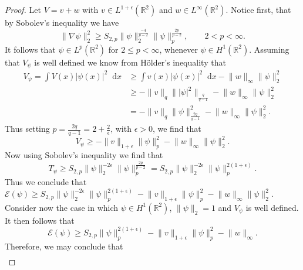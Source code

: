 \documentclass[a4paper,11pt]{article}
\newcommand*\diff{\mathop{}\!\mathrm{d}}
\newcommand{\R}{\mathbb{R}}
\numberwithin{equation}{section}
\begin{document}
\begin{proof}
	Let $ V=v+w $ with $ v\in L^{1+\epsilon}(\R^2)  $ and $ w\in L^\infty(\R^2) $. Notice first, that by Sobolev's inequality we have \begin{equation}
	\lVert\nabla\psi\rVert_2^2\geq S_{2,p}\lVert\psi\rVert_2^{\frac{-4}{p-2}}\lVert\psi\rVert_p^{\frac{2p}{p-2}},\qquad 2<p<\infty.
	\end{equation}
	It follows that $ \psi\in L^p(\R^2) $ for $ 2\leq p<\infty $, whenever $ \psi\in H^1(\R^2) $.
	Assuming that $ V_\psi $ is well defined we know from H\"older's inequality that\begin{equation}
	\begin{aligned}
	V_\psi=\int V(x)\lvert\psi(x)\rvert^2 \diff x&\geq\int v(x)\lvert\psi(x)\rvert^2 \diff x-\lVert w\rVert_\infty \lVert \psi\rVert_2^2\\&\geq-\lVert v\rVert_q\lVert|\psi|^2\rVert_{\frac{q}{q-1}}-\lVert w\rVert_\infty \lVert \psi\rVert_2^2\\&=-\lVert v\rVert_q\lVert\psi\rVert_{\frac{2q}{q-1}}^{2}-\lVert w\rVert_\infty \lVert \psi\rVert_2^2.
	\end{aligned}
	\end{equation} Thus setting $ p=\frac{2q}{q-1}=2+\frac{2}{\epsilon} $,
	 with $ \epsilon>0 $, we find that \begin{equation}
	V_\psi\geq-\lVert v\rVert_{1+\epsilon}\lVert \psi\rVert_p^2-\lVert w\rVert_\infty \lVert \psi\rVert_2^2.
	\end{equation}
	Now using Sobolev's inequality we find that\begin{equation}
	T_\psi\geq S_{2,p}\lVert \psi\rVert_2^{-2\epsilon}\lVert \psi \rVert_p^{\frac{2p}{p-2}}=S_{2,p}\lVert \psi\rVert_2^{-2\epsilon}\lVert \psi \rVert_p^{2(1+\epsilon)}.
	\end{equation}
	Thus we conclude that $ \mathcal{E}(\psi)\geq S_{2,p}\lVert \psi\rVert_2^{-2\epsilon}\lVert \psi \rVert_p^{2(1+\epsilon)}-\lVert v\rVert_{1+\epsilon}\lVert \psi\rVert_p^2-\lVert w\rVert_\infty \lVert \psi\rVert_2^2 $.
	Consider now the case in which $ \psi\in H^1(\R^2) $, $ \lVert \psi \rVert_2=1 $ and $ V_\psi $ is well defined. It then follows that \begin{equation}
	\mathcal{E}(\psi)\geq S_{2,p}\lVert \psi \rVert_p^{2(1+\epsilon)}-\lVert v\rVert_{1+\epsilon}\lVert \psi\rVert_p^2-\lVert w\rVert_\infty.
	\end{equation}
	Therefore, we may conclude that \begin{equation}
	\begin{aligned}

\end{aligned}
\end{equation}
\end{proof}
\end{document}
